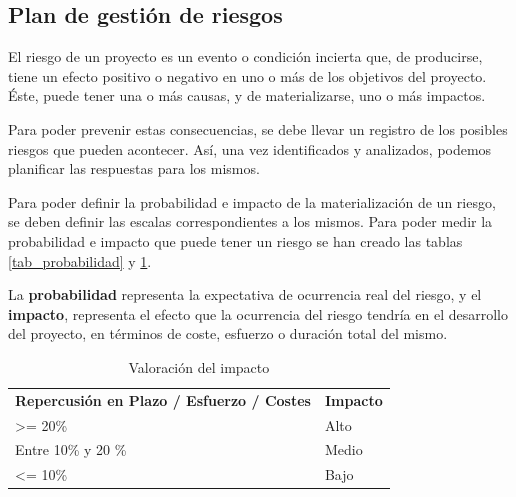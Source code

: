 \subsection{Plan de gestión de riesgos}
El riesgo de un proyecto es un evento o condición incierta que, de producirse, tiene un efecto positivo o negativo en uno o más de los objetivos del proyecto. Éste, puede tener una o más causas, y de materializarse, uno o más impactos\cite{pmbok}.


Para poder prevenir estas consecuencias, se debe llevar un registro de los posibles riesgos que pueden acontecer. Así, una vez identificados y analizados, podemos planificar las respuestas para los mismos.


Para poder definir la probabilidad e impacto de la materialización de un riesgo, se deben definir las escalas correspondientes a los mismos. Para poder medir la probabilidad e impacto que puede tener un riesgo se han creado las tablas \ref{tab_probabilidad} y \ref{tab_impacto}.


La \textbf{probabilidad} representa la expectativa de ocurrencia real del riesgo, y el \textbf{impacto}, representa el efecto que la ocurrencia del riesgo tendría en el desarrollo del proyecto, en términos de coste, esfuerzo o duración total del mismo. 

\begin{table}[htpb]
\centering
\begin{tabular}{|l|l|}
\hline
\rowcolor[gray]{0.9}\multicolumn{2}{|c|}{\textbf{Valoración del impacto}}                                                  \\ \hline
\multicolumn{1}{|c|}{\textbf{Repercusión en Plazo / Esfuerzo / Costes}} & \multicolumn{1}{c|}{\textbf{Impacto}} \\ \hline
\textgreater= 20\%                                             & Alto                         \\ \hline
Entre 10\% y 20 \%                                             & Medio                        \\ \hline
\textless= 10\%                                                & Bajo                         \\ \hline
\end{tabular}
\caption{Valoración del impacto}
\label{tab_impacto}
\end{table}

